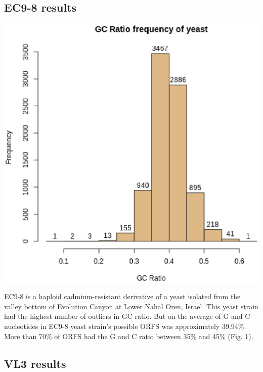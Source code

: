 \documentclass{article}
\begin{document}
\subsection{EC9-8 results}

\begin{minipage}{0.5\textwidth}
\includegraphics[width=\textwidth]{images/EC9-8_ASinica_2011_AGSJ01000000.eps}
\end{minipage}
\begin{minipage}{0.5\textwidth}
EC9-8 is a haploid cadmium-resistant derivative of a yeast isolated from the valley bottom of Evolution Canyon 
at Lower Nahal Oren, Israel. This yeast strain had the highest number of outliers in GC ratio.
But on the average of G and C nucleotides in EC9-8 yeast strain's possible ORFS was approximately 39.94\%. More than 70\% of ORFS had the G and C ratio between 35\% and 45\% (Fig. 1). \vspace{1cm}\\
\end{minipage}


\subsection{VL3 results} 
\end{document}
